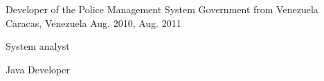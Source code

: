 \begin{cventries}

\cventry
{Developer of the Police Management System} %
{Government from Venezuela} %
{Caracas, Venezuela} %
{Aug. 2010, Aug. 2011 } %
{ %
\begin{cvitems}
\item {System analyst}
\item {Java Developer}
\end{cvitems}
}


\end{cventries}

